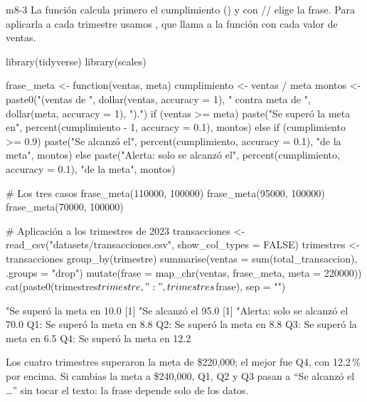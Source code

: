 \begin{solucion}{m8-3}
La función calcula primero el cumplimiento () y con
// elige la frase. Para aplicarla a
cada trimestre usamos , que llama a la función con cada
valor de ventas.
\end{solucion}

\begin{rcode}
library(tidyverse)
library(scales)

frase_meta <- function(ventas, meta) {
  cumplimiento <- ventas / meta
  montos <- paste0("(ventas de ", dollar(ventas, accuracy = 1),
                   " contra meta de ", dollar(meta, accuracy = 1), ").")
  if (ventas >= meta) {
    paste("Se superó la meta en",
          percent(cumplimiento - 1, accuracy = 0.1), montos)
  } else if (cumplimiento >= 0.9) {
    paste("Se alcanzó el", percent(cumplimiento, accuracy = 0.1),
          "de la meta", montos)
  } else {
    paste("Alerta: solo se alcanzó el",
          percent(cumplimiento, accuracy = 0.1), "de la meta", montos)
  }
}

# Los tres casos
frase_meta(110000, 100000)
frase_meta(95000, 100000)
frase_meta(70000, 100000)

# Aplicación a los trimestres de 2023
transacciones <- read_csv("datasets/transacciones.csv",
                          show_col_types = FALSE)
trimestres <- transacciones %
  group_by(trimestre) %
  summarise(ventas = sum(total_transaccion), .groups = "drop") %
  mutate(frase = map_chr(ventas, frase_meta, meta = 220000))
cat(paste0(trimestres$trimestre, ": ", trimestres$frase), sep = "\n")
\end{rcode}
\begin{rsalida}
[1] "Se superó la meta en 10.0%
[1] "Se alcanzó el 95.0%
[1] "Alerta: solo se alcanzó el 70.0%
Q1: Se superó la meta en 8.8%
Q2: Se superó la meta en 8.8%
Q3: Se superó la meta en 6.5%
Q4: Se superó la meta en 12.2%
\end{rsalida}

Los cuatro trimestres superaron la meta de \$220,000; el mejor fue Q4, con
12.2\,\% por encima. Si cambias la meta a \$240,000, Q1, Q2 y Q3 pasan a
``Se alcanzó el \ldots'' sin tocar el texto: la frase depende solo de los
datos.


